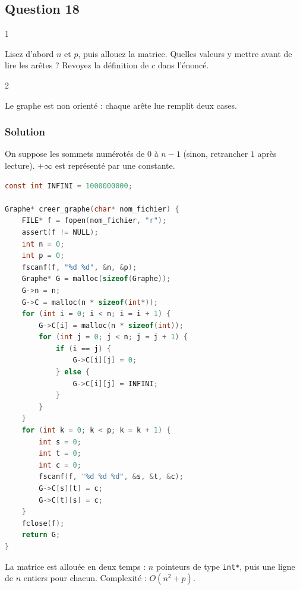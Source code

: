 \documentclass[11pt,a4paper]{article}
\begin{document}
\hypertarget{question-18}{%
\subsection{Question 18}\label{question-18}}

\begin{indication}{1}

Lisez d'abord \(n\) et \(p\), puis allouez la matrice. Quelles valeurs y mettre avant de lire les arêtes ? Revoyez la définition de \(c\) dans l'énoncé.

\end{indication}

\begin{indication}{2}

Le graphe est non orienté : chaque arête lue remplit deux cases.

\end{indication}

\hypertarget{solution-17}{%
\subsubsection{Solution}\label{solution-17}}

On suppose les sommets numérotés de \(0\) à \(n-1\) (sinon, retrancher \(1\) après lecture). \(+\infty\) est représenté par une constante.

\begin{lstlisting}[language=C]
const int INFINI = 1000000000;

Graphe* creer_graphe(char* nom_fichier) {
    FILE* f = fopen(nom_fichier, "r");
    assert(f != NULL);
    int n = 0;
    int p = 0;
    fscanf(f, "%d %d", &n, &p);
    Graphe* G = malloc(sizeof(Graphe));
    G->n = n;
    G->C = malloc(n * sizeof(int*));
    for (int i = 0; i < n; i = i + 1) {
        G->C[i] = malloc(n * sizeof(int));
        for (int j = 0; j < n; j = j + 1) {
            if (i == j) {
                G->C[i][j] = 0;
            } else {
                G->C[i][j] = INFINI;
            }
        }
    }
    for (int k = 0; k < p; k = k + 1) {
        int s = 0;
        int t = 0;
        int c = 0;
        fscanf(f, "%d %d %d", &s, &t, &c);
        G->C[s][t] = c;
        G->C[t][s] = c;
    }
    fclose(f);
    return G;
}
\end{lstlisting}

La matrice est allouée en deux temps : \(n\) pointeurs de type \texttt{int*}, puis une ligne de \(n\) entiers pour chacun. Complexité : \(O(n^2+p)\).
\end{document}
